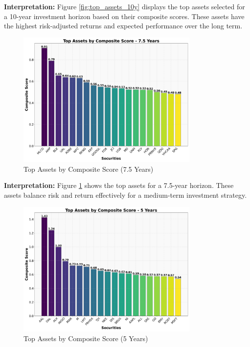\textbf{Interpretation:} Figure \ref{fig:top_assets_10y} displays the top assets selected for a 10-year investment horizon based on their composite scores. These assets have the highest risk-adjusted returns and expected performance over the long term.

\begin{figure}[!htbp]
    \centering
    \includegraphics[width=0.8\textwidth]{../Figures/top_assets_composite_score_7_5_years.png}
    \caption{Top Assets by Composite Score (7.5 Years)}
    \label{fig:top_assets_7_5y}
\end{figure}

\textbf{Interpretation:} Figure \ref{fig:top_assets_7_5y} shows the top assets for a 7.5-year horizon. These assets balance risk and return effectively for a medium-term investment strategy.

\begin{figure}[!htbp]
    \centering
    \includegraphics[width=0.8\textwidth]{../Figures/top_assets_composite_score_5_years.png}
    \caption{Top Assets by Composite Score (5 Years)}
    \label{fig:top_assets_5y}
\end{figure}

